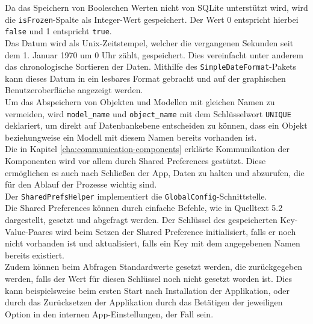 \documentclass[oneside]{ausarbeitung}
\begin{document}
Da das Speichern von Booleschen Werten nicht von SQLite unterstützt wird, wird die \texttt{isFrozen}-Spalte als Integer-Wert gespeichert. Der Wert 0 entspricht hierbei \texttt{false} und 1 entspricht \texttt{true}.\\
Das Datum wird als Unix-Zeitstempel, welcher die vergangenen Sekunden seit dem 1. Januar 1970 um 0 Uhr zählt, gespeichert. Dies vereinfacht unter anderem das chronologische Sortieren der Daten. Mithilfe des \texttt{SimpleDateFormat}-Pakets kann dieses Datum in ein lesbares Format gebracht und auf der graphischen Benutzeroberfläche angezeigt werden.\\
Um das Abspeichern von Objekten und Modellen mit gleichen Namen zu vermeiden, wird \texttt{model\_name} und \texttt{object\_name} mit dem Schlüsselwort \texttt{UNIQUE} deklariert, um direkt auf Datenbankebene entscheiden zu können, dass ein Objekt beziehungweise ein Modell mit diesem Namen bereits vorhanden ist.\\
Die in Kapitel \ref{cha:communication-components} erklärte Kommunikation der Komponenten wird vor allem durch Shared Preferences gestützt. Diese ermöglichen es auch nach Schließen der App, Daten zu halten und abzurufen, die für den Ablauf der Prozesse wichtig sind.\\
Der \texttt{SharedPrefsHelper} implementiert die \texttt{GlobalConfig}-Schnittstelle.\\
Die Shared Preferences können durch einfache Befehle, wie in Quelltext 5.2 dargestellt, gesetzt und abgefragt werden. Der Schlüssel des gespeicherten Key-Value-Paares wird beim Setzen der Shared Preference initialisiert, falls er noch nicht vorhanden ist und aktualisiert, falls ein Key mit dem angegebenen Namen bereits existiert.\\
Zudem können beim Abfragen Standardwerte gesetzt werden, die zurückgegeben werden, falls der Wert für diesen Schlüssel noch nicht gesetzt worden ist. Dies kann beispielsweise beim ersten Start nach Installation der Applikation, oder durch das Zurücksetzen der Applikation durch das Betätigen der jeweiligen Option in den internen App-Einstellungen, der Fall sein.
\end{document}
